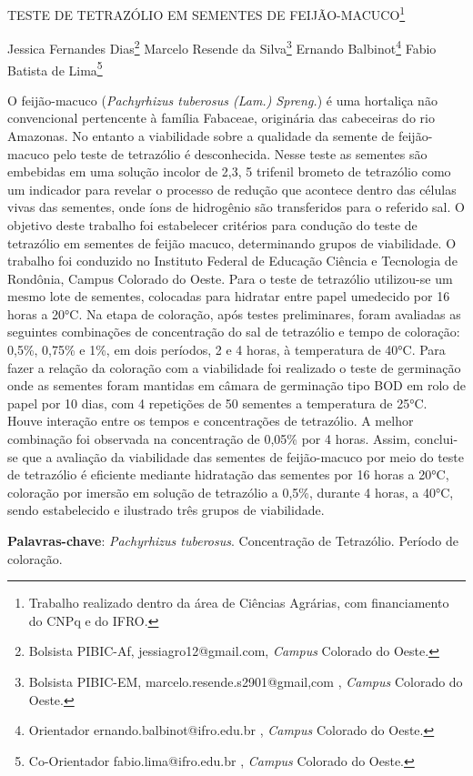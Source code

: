 \documentclass[article,12pt,onesidea,4paper,english,brazil]{abntex2}
\begin{document}
	
	
	\frenchspacing 
	
	\begin{center}
		\LARGE TESTE DE TETRAZÓLIO EM SEMENTES DE FEIJÃO-MACUCO\footnote{Trabalho realizado dentro da área de Ciências Agrárias, com financiamento do CNPq e do IFRO.}
		
		\normalsize
		Jessica Fernandes Dias\footnote{Bolsista PIBIC-Af, jessiagro12@gmail.com, \textit{Campus} Colorado do Oeste.} 
		Marcelo Resende da Silva\footnote{Bolsista PIBIC-EM, marcelo.resende.s2901@gmail,com , \textit{Campus} Colorado do Oeste.} 
		Ernando Balbinot\footnote{Orientador ernando.balbinot@ifro.edu.br , \textit{Campus} Colorado do Oeste.} 
		Fabio Batista de Lima\footnote{Co-Orientador fabio.lima@ifro.edu.br , \textit{Campus} Colorado do Oeste.} 
	\end{center}
	
	\noindent O feijão-macuco (\textit{Pachyrhizus tuberosus (Lam.) Spreng.}) é uma hortaliça não
	convencional pertencente à família Fabaceae, originária das cabeceiras do rio
	Amazonas. No entanto a viabilidade sobre a qualidade da semente de feijão-macuco
	pelo teste de tetrazólio é desconhecida. Nesse teste as sementes são embebidas
	em uma solução incolor de 2,3, 5 trifenil brometo de tetrazólio como um indicador
	para revelar o processo de redução que acontece dentro das células vivas das
	sementes, onde íons de hidrogênio são transferidos para o referido sal. O objetivo
	deste trabalho foi estabelecer critérios para condução do teste de tetrazólio em
	sementes de feijão macuco, determinando grupos de viabilidade. O trabalho foi
	conduzido no Instituto Federal de Educação Ciência e Tecnologia de Rondônia,
	Campus Colorado do Oeste. Para o teste de tetrazólio utilizou-se um mesmo lote de
	sementes, colocadas para hidratar entre papel umedecido por 16 horas a 20°C. Na
	etapa de coloração, após testes preliminares, foram avaliadas as seguintes
	combinações de concentração do sal de tetrazólio e tempo de coloração: 0,5\%,
	0,75\% e 1\%, em dois períodos, 2 e 4 horas, à temperatura de 40°C. Para fazer a
	relação da coloração com a viabilidade foi realizado o teste de germinação onde as
	sementes foram mantidas em câmara de germinação tipo BOD em rolo de papel por
	10 dias, com 4 repetições de 50 sementes a temperatura de 25°C. Houve interação
	entre os tempos e concentrações de tetrazólio. A melhor combinação foi observada
	na concentração de 0,05\% por 4 horas. Assim, conclui-se que a avaliação da
	viabilidade das sementes de feijão-macuco por meio do teste de tetrazólio é eficiente
	mediante hidratação das sementes por 16 horas a 20°C, coloração por imersão em
	solução de tetrazólio a 0,5\%, durante 4 horas, a 40°C, sendo estabelecido e
	ilustrado três grupos de viabilidade.
	
	\vspace{\onelineskip}
	
	\noindent
	\textbf{Palavras-chave}: \textit{Pachyrhizus tuberosus}. Concentração de Tetrazólio. Período de coloração.	
	
\end{document}
